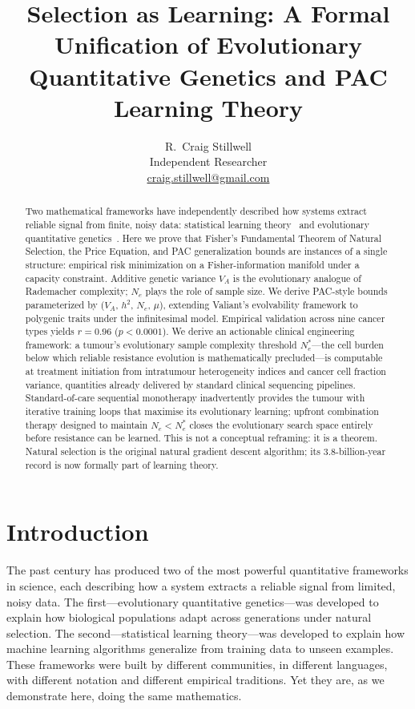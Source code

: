 \documentclass[12pt]{article}
\title{Selection as Learning: A Formal Unification of Evolutionary\\
Quantitative Genetics and PAC Learning Theory}
\author{R.\ Craig Stillwell\\[0.4em]
\small Independent Researcher\\
\small \href{mailto:craig.stillwell@gmail.com}{craig.stillwell@gmail.com}}
\date{}
\theoremstyle{remark}
\begin{document}
\maketitle

\begin{abstract}
Two mathematical frameworks have independently described how systems extract reliable signal from finite, noisy data: statistical learning theory~\cite{vapnik1971,valiant1984} and evolutionary quantitative genetics~\cite{fisher1918,price1970,lande1979}. Here we prove that Fisher's Fundamental Theorem of Natural Selection, the Price Equation, and PAC generalization bounds are instances of a single structure: empirical risk minimization on a Fisher-information manifold under a capacity constraint. Additive genetic variance $V_A$ is the evolutionary analogue of Rademacher complexity; $N_e$ plays the role of sample size. We derive PAC-style bounds parameterized by ($V_A$, $h^2$, $N_e$, $\mu$), extending Valiant's evolvability framework to polygenic traits under the infinitesimal model. Empirical validation across nine cancer types yields $r = 0.96$ ($p < 0.0001$). We derive an actionable clinical engineering framework: a tumour's evolutionary sample complexity threshold $N_e^*$---the cell burden below which reliable resistance evolution is mathematically precluded---is computable at treatment initiation from intratumour heterogeneity indices and cancer cell fraction variance, quantities already delivered by standard clinical sequencing pipelines. Standard-of-care sequential monotherapy inadvertently provides the tumour with iterative training loops that maximise its evolutionary learning; upfront combination therapy designed to maintain $N_e < N_e^*$ closes the evolutionary search space entirely before resistance can be learned. This is not a conceptual reframing: it is a theorem. Natural selection is the original natural gradient descent algorithm; its 3.8-billion-year record is now formally part of learning theory.
\end{abstract}

\section{Introduction}

The past century has produced two of the most powerful quantitative frameworks in science, each describing how a system extracts a reliable signal from limited, noisy data. The first---evolutionary quantitative genetics---was developed to explain how biological populations adapt across generations under natural selection. The second---statistical learning theory---was developed to explain how machine learning algorithms generalize from training data to unseen examples. These frameworks were built by different communities, in different languages, with different notation and different empirical traditions. Yet they are, as we demonstrate here, doing the same mathematics.
\end{document}
